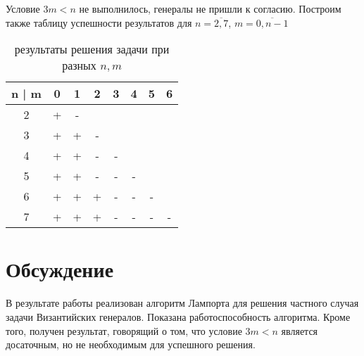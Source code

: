 \documentclass[a4paper,12pt]{article}
\begin{document}
    Условие $ 3m < n $ не выполнилось, генералы не пришли к согласию. Построим также таблицу успешности результатов для $ n = \overline{2, 7} $, $ m = \overline{0, n - 1} $

    \begin{table}[H]
    \caption{результаты решения задачи при разных $n, m$}
        \begin{tabular}{| c | c | c | c | c | c | c | c |}
            \hline
             n | m & 0 & 1 & 2 & 3 & 4 & 5 & 6 \\
            \hline
            2 & + & - & & & & &  \\
            \hline
            3 & + & + & - & & & & \\
            \hline
            4 & + & + & - & - & & & \\
            \hline
            5 & + & + & - & - & - & & \\
            \hline
            6 & + & + & + & - & - & - & \\
            \hline
            7 & + & + & + & - & - & - & - \\
            \hline
        \end{tabular}
        \centering
    \end{table}

    \section{Обсуждение}
    \quad В результате работы реализован алгоритм Лампорта для решения частного случая задачи Византийских генералов. Показана работоспособность алгоритма. Кроме того, получен результат, говорящий о том, что условие $ 3m < n $ является досаточным, но не необходимым для успешного решения.
\end{document}
